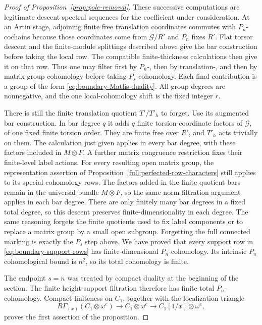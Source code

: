 \begin{proof}[Proof of Proposition~\ref{prop:pole-removal}]
These successive computations are legitimate descent spectral
sequences for the coefficient under consideration.  At an Artin
stage, adjoining finite free translation coordinates commutes with
$P_n$-cochains because those coordinates come from $\mathcal G/R'$
and $P_n$ fixes $R'$.  Flat torsor descent and the finite-module
splittings described above give the bar construction before taking
the local row.  The compatible finite-thickness calculations then
give it on that row.  Thus one may filter first by $P_n$-, then by
translation-, and then by matrix-group cohomology before taking
$P_s$-cohomology.  Each final contribution is a group of the form
\eqref{eq:boundary-Matlis-duality}.  All group degrees are
nonnegative, and the one local-cohomology shift is the fixed
integer $r$.

There is still the finite translation quotient $T'/T'_h$ to
forget.  Use its augmented bar construction.  In bar degree $q$
it adds $q$ finite torsion-coordinate factors of $\mathcal G$,
of one fixed finite torsion order.  They are finite free over
$R'$, and $T'_h$ acts trivially on them.  The calculation just
given applies in every bar degree, with these factors included
in $M\otimes F$.  A further matrix congruence restriction fixes
their finite-level label actions.
For every resulting open matrix group, the representation
assertion of Proposition~\ref{full:perfected-row-characters}
still applies to its special cohomology rows.  The factors
added in the finite quotient bars remain in the universal
bundle $M\otimes F$, so the same norm-filtration argument
applies in each bar degree.
There are only finitely many
bar degrees in a fixed total degree, so this descent preserves
finite-dimensionality in each degree.  The same reasoning forgets
the finite quotients used to fix label components or to replace a
matrix group by a small open subgroup.  Forgetting the full
connected marking is exactly the $P_s$ step above.  We have proved
that every support row in \eqref{eq:boundary-support-rows} has
finite-dimensional $P_n$-cohomology.  Its intrinsic $P_n$
cohomological bound is $n^2$, so its total cohomology is finite.

The endpoint $s=n$ was treated by compact duality at the beginning
of the section.  The finite height-support filtration therefore
has finite total $P_n$-cohomology.  Compact finiteness on $C_1$,
together with the localization triangle
\[
 R\Gamma_{(x)}(C_1\otimes\omega^e)
 \longrightarrow C_1\otimes\omega^e
 \longrightarrow C_1[1/x]\otimes\omega^e,
\]
proves the first assertion of the proposition.


\end{proof}
